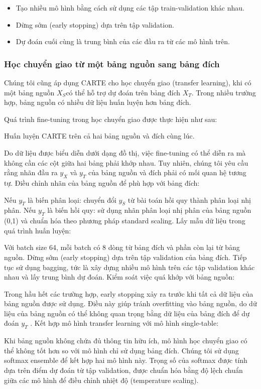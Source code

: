 \documentclass{article}
\begin{document}
\begin{itemize}
    \item Tạo nhiều mô hình bằng cách sử dụng các tập train-validation khác nhau.
    \item Dừng sớm (early stopping) dựa trên tập validation.
    \item Dự đoán cuối cùng là trung bình của các đầu ra từ các mô hình trên.
\end{itemize}

\subsubsection{Học chuyển giao từ một bảng nguồn sang bảng đích}
Chúng tôi cũng áp dụng CARTE cho học chuyển giao (transfer learning), khi có một bảng nguồn $X_S$có thể hỗ trợ dự đoán trên bảng đích $X_T$. Trong nhiều trường hợp, bảng nguồn có nhiều dữ liệu huấn luyện hơn bảng đích.

Quá trình fine-tuning trong học chuyển giao được thực hiện như sau:

Huấn luyện CARTE trên cả hai bảng nguồn và đích cùng lúc.

Do dữ liệu được biểu diễn dưới dạng đồ thị, việc fine-tuning có thể diễn ra mà không cần các cột giữa hai bảng phải khớp nhau.
Tuy nhiên, chúng tôi yêu cầu rằng nhãn đầu ra $y_X$ và $y_T$ của bảng nguồn và đích phải có mối quan hệ tương tự.
Điều chỉnh nhãn của bảng nguồn để phù hợp với bảng đích:

Nếu $y_T$ là biến phân loại: chuyển đổi $y_S$ từ bài toán hồi quy thành phân loại nhị phân.
Nếu $y_T$ là biến hồi quy: sử dụng nhãn phân loại nhị phân của bảng nguồn ({0,1}) và chuẩn hóa theo phương pháp standard scaling.
Lấy mẫu dữ liệu trong quá trình huấn luyện:

Với batch size 64, mỗi batch có 8 dòng từ bảng đích và phần còn lại từ bảng nguồn.
Dừng sớm (early stopping) dựa trên tập validation của bảng đích.
Tiếp tục sử dụng bagging, tức là xây dựng nhiều mô hình trên các tập validation khác nhau và lấy trung bình dự đoán.
Kiểm soát việc quá khớp với bảng nguồn:

Trong hầu hết các trường hợp, early stopping xảy ra trước khi tất cả dữ liệu của bảng nguồn được sử dụng.
Điều này giúp tránh overfitting vào bảng nguồn, do dữ liệu của bảng nguồn có thể không quan trọng bằng dữ liệu của bảng đích để dự đoán $y_T$ .
Kết hợp mô hình transfer learning với mô hình single-table:

Khi bảng nguồn không chứa đủ thông tin hữu ích, mô hình học chuyển giao có thể không tốt hơn so với mô hình chỉ sử dụng bảng đích.
Chúng tôi sử dụng softmax ensemble để kết hợp hai mô hình này. Trọng số của softmax được tính dựa trên điểm dự đoán từ tập validation, được chuẩn hóa bằng độ lệch chuẩn giữa các mô hình để điều chỉnh nhiệt độ (temperature scaling).
\end{document}
